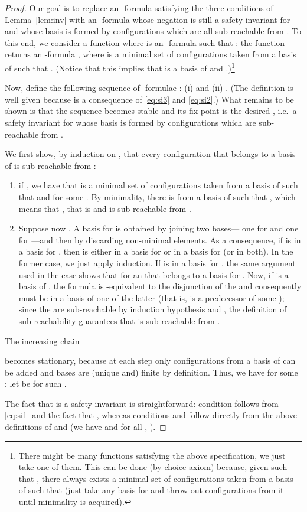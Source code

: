 \documentclass{LMCS}
\theoremstyle{plain}\newtheorem{assumption}[thm]{Assumption}
\theoremstyle{plain}\newtheorem{proposition}[thm]{Proposition}
\theoremstyle{plain}\newtheorem{property}[thm]{Property}
\theoremstyle{plain}\newtheorem{example}[thm]{Example}
\theoremstyle{plain}\newtheorem{claim}[thm]{Claim}
\theoremstyle{plain}\newtheorem{lemma}[thm]{Lemma}
\begin{document}
\begin{proof}
  Our goal is to replace an -formula  satisfying the
  three conditions of Lemma~\ref{lem:inv} with an -formula
   whose negation is still a safety invariant for  and whose
  basis is formed by configurations which are all sub-reachable from
  .  To this end, we consider a function  where  is
  an -formula such that : the function  returns an
  -formula , where  is a minimal set of
  configurations taken from a basis of  such that
  .  (Notice that this implies that  is a
  basis of  and .)\footnote{There might be many functions
     satisfying the above specification, we just take one of
    them.  This can be done (by choice axiom) because, given  such
    that , there always exists a
    minimal set of configurations  taken from a
    basis of  such that  (just take any basis for  and
    throw out configurations from it until minimality is acquired).  }

  Now, define the following sequence of -formulae :
  (i)  and (ii) .  (The definition is well given because
   is a consequence of
  \eqref{eq:si3} and \eqref{eq:si2}.)  What remains to be shown is
  that the sequence becomes stable and its fix-point is the desired
  , i.e.\ a safety invariant for  whose basis is formed by
  configurations which are sub-reachable from .

  We first show, by induction on , that every configuration 
  that belongs to a basis of  is sub-reachable from :
  \begin{enumerate}[]
  \item if , we have that  is a minimal set
    of configurations taken from a basis of  such that
     and  for some . By minimality, there is
     from a basis of  such that , which means that , that is
     and  is sub-reachable from .
  \item Suppose now .  A basis for  is obtained by joining two bases--- one for  and one
    for ---and then by discarding non-minimal
    elements.  As a consequence, if  is in a basis for , then
     is either in a basis for  or in a basis for
     (or in both). In the former case, we just
    apply induction.  If  is in a basis for , the same argument used in the case  shows that  for an  that belongs to a basis for .  Now,
    if  is a basis of , the formula
     is -equivalent to the disjunction of the
     and consequently  must be in a basis of
    one of the latter (that is,  is a predecessor of some
    ); since the  are sub-reachable by induction
    hypothesis and , the definition of sub-reachability
    guarantees that  is sub-reachable from .
  \end{enumerate}
  The increasing chain
  
  becomes stationary, because at each step only configurations from a
  basis of  can be added and bases are (unique and) finite by
  definition.  Thus, we have  for
  some : let  be  for such .

  The fact that  is a safety invariant is straightforward:
  condition  follows from
  \eqref{eq:si1} and the fact that , whereas conditions  and 
  follow directly from the above definitions of  and 
  (we have  and for all ,
  ).
\end{proof}
\end{document}
